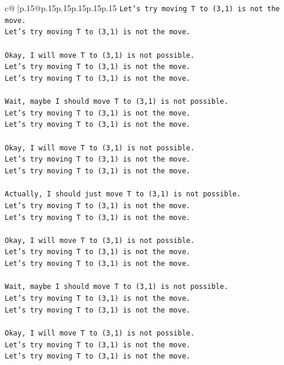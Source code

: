 \documentclass{article}
\begin{document}
{\begin{supertabular}{c@{$\;$}|p{.15\linewidth}@{}p{.15\linewidth}p{.15\linewidth}p{.15\linewidth}p{.15\linewidth}p{.15\linewidth}}
{{{\texttt{Let's try moving T to (3,1) is not the move.} \\
\texttt{Let's try moving T to (3,1) is not the move.} \\
\\ 
\texttt{Okay, I will move T to (3,1) is not possible.} \\
\texttt{Let's try moving T to (3,1) is not the move.} \\
\texttt{Let's try moving T to (3,1) is not the move.} \\
\\ 
\texttt{Wait, maybe I should move T to (3,1) is not possible.} \\
\texttt{Let's try moving T to (3,1) is not the move.} \\
\texttt{Let's try moving T to (3,1) is not the move.} \\
\\ 
\texttt{Okay, I will move T to (3,1) is not possible.} \\
\texttt{Let's try moving T to (3,1) is not the move.} \\
\texttt{Let's try moving T to (3,1) is not the move.} \\
\\ 
\texttt{Actually, I should just move T to (3,1) is not possible.} \\
\texttt{Let's try moving T to (3,1) is not the move.} \\
\texttt{Let's try moving T to (3,1) is not the move.} \\
\\ 
\texttt{Okay, I will move T to (3,1) is not possible.} \\
\texttt{Let's try moving T to (3,1) is not the move.} \\
\texttt{Let's try moving T to (3,1) is not the move.} \\
\\ 
\texttt{Wait, maybe I should move T to (3,1) is not possible.} \\
\texttt{Let's try moving T to (3,1) is not the move.} \\
\texttt{Let's try moving T to (3,1) is not the move.} \\
\\ 
\texttt{Okay, I will move T to (3,1) is not possible.} \\
\texttt{Let's try moving T to (3,1) is not the move.} \\
\texttt{Let's try moving T to (3,1) is not the move.} \\
\\ 
}}}
\end{supertabular}}
\end{document}
